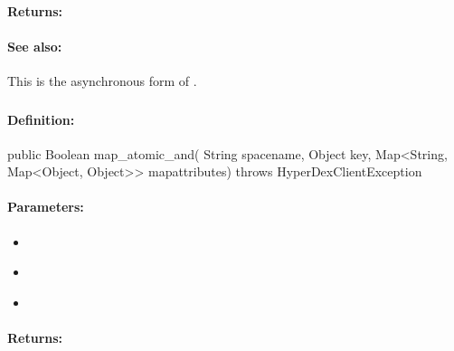 \paragraph{Returns:}


\paragraph{See also:}  This is the asynchronous form of .

\pagebreak
\subsubsection{}
\label{api:java:map_atomic_and}


\paragraph{Definition:}
\begin{javacode}
public Boolean map_atomic_and(
        String spacename,
        Object key,
        Map<String, Map<Object, Object>> mapattributes) throws HyperDexClientException
\end{javacode}

\paragraph{Parameters:}
\begin{itemize}[noitemsep]
\item {}\\

\item {}\\

\item {}\\

\end{itemize}

\paragraph{Returns:}


